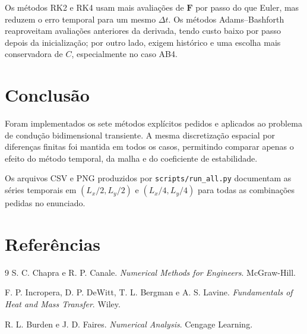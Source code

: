 \documentclass[12pt,a4paper]{article}
\begin{document}
Os métodos RK2 e RK4 usam mais avaliações de $\mathbf{F}$ por passo do que Euler,
mas reduzem o erro temporal para um mesmo $\Delta t$. Os métodos
Adams--Bashforth reaproveitam avaliações anteriores da derivada, tendo custo
baixo por passo depois da inicialização; por outro lado, exigem histórico e uma
escolha mais conservadora de $C$, especialmente no caso AB4.

\section{Conclusão}

Foram implementados os sete métodos explícitos pedidos e aplicados ao problema
de condução bidimensional transiente. A mesma discretização espacial por
diferenças finitas foi mantida em todos os casos, permitindo comparar apenas o
efeito do método temporal, da malha e do coeficiente de estabilidade.

Os arquivos CSV e PNG produzidos por \texttt{scripts/run\_all.py} documentam as
séries temporais em $(L_x/2,L_y/2)$ e $(L_x/4,L_y/4)$ para todas as combinações
pedidas no enunciado.

\section{Referências}

\begin{thebibliography}{9}
S. C. Chapra e R. P. Canale.
\textit{Numerical Methods for Engineers}. McGraw-Hill.

F. P. Incropera, D. P. DeWitt, T. L. Bergman e A. S. Lavine.
\textit{Fundamentals of Heat and Mass Transfer}. Wiley.

R. L. Burden e J. D. Faires.
\textit{Numerical Analysis}. Cengage Learning.
\end{thebibliography}
\end{document}
